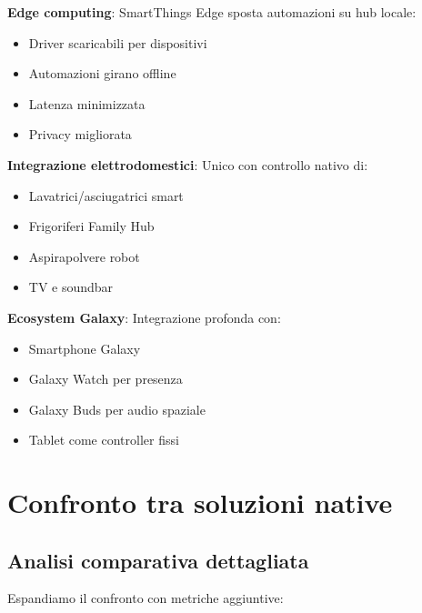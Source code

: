 \textbf{Edge computing}: SmartThings Edge sposta automazioni su hub locale:
\begin{itemize}
    \item Driver scaricabili per dispositivi
    \item Automazioni girano offline
    \item Latenza minimizzata
    \item Privacy migliorata
\end{itemize}

\textbf{Integrazione elettrodomestici}: Unico con controllo nativo di:
\begin{itemize}
    \item Lavatrici/asciugatrici smart
    \item Frigoriferi Family Hub
    \item Aspirapolvere robot
    \item TV e soundbar
\end{itemize}

\textbf{Ecosystem Galaxy}: Integrazione profonda con:
\begin{itemize}
    \item Smartphone Galaxy
    \item Galaxy Watch per presenza
    \item Galaxy Buds per audio spaziale
    \item Tablet come controller fissi
\end{itemize}

\cite{SmartThings}

\section{Confronto tra soluzioni native}

\subsection{Analisi comparativa dettagliata}

Espandiamo il confronto con metriche aggiuntive:

